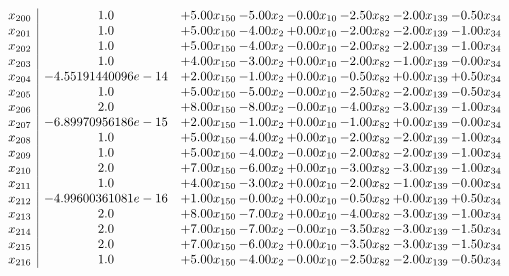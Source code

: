 \documentclass[8pt]{article}
\begin{document}
\[\begin{array}{c| c c@{\hskip 2pt} c@{\hskip 2pt} c@{\hskip 2pt} c@{\hskip 2pt} c@{\hskip 2pt} c@{\hskip 2pt} }
 x_{200}   &  1.0 & +  5.00 x_{150} & -5.00 x_{2} & -0.00 x_{10} & -2.50 x_{82} & -2.00 x_{139} & -0.50 x_{34}\\
 x_{201}   &  1.0 & +  5.00 x_{150} & -4.00 x_{2} & +  0.00 x_{10} & -2.00 x_{82} & -2.00 x_{139} & -1.00 x_{34}\\
 x_{202}   &  1.0 & +  5.00 x_{150} & -4.00 x_{2} & -0.00 x_{10} & -2.00 x_{82} & -2.00 x_{139} & -1.00 x_{34}\\
 x_{203}   &  1.0 & +  4.00 x_{150} & -3.00 x_{2} & +  0.00 x_{10} & -2.00 x_{82} & -1.00 x_{139} & -0.00 x_{34}\\
 x_{204}   &  -4.55191440096e-14 & +  2.00 x_{150} & -1.00 x_{2} & +  0.00 x_{10} & -0.50 x_{82} & +  0.00 x_{139} & +  0.50 x_{34}\\
 x_{205}   &  1.0 & +  5.00 x_{150} & -5.00 x_{2} & -0.00 x_{10} & -2.50 x_{82} & -2.00 x_{139} & -0.50 x_{34}\\
 x_{206}   &  2.0 & +  8.00 x_{150} & -8.00 x_{2} & -0.00 x_{10} & -4.00 x_{82} & -3.00 x_{139} & -1.00 x_{34}\\
 x_{207}   &  -6.89970956186e-15 & +  2.00 x_{150} & -1.00 x_{2} & +  0.00 x_{10} & -1.00 x_{82} & +  0.00 x_{139} & -0.00 x_{34}\\
 x_{208}   &  1.0 & +  5.00 x_{150} & -4.00 x_{2} & +  0.00 x_{10} & -2.00 x_{82} & -2.00 x_{139} & -1.00 x_{34}\\
 x_{209}   &  1.0 & +  5.00 x_{150} & -4.00 x_{2} & -0.00 x_{10} & -2.00 x_{82} & -2.00 x_{139} & -1.00 x_{34}\\
 x_{210}   &  2.0 & +  7.00 x_{150} & -6.00 x_{2} & +  0.00 x_{10} & -3.00 x_{82} & -3.00 x_{139} & -1.00 x_{34}\\
 x_{211}   &  1.0 & +  4.00 x_{150} & -3.00 x_{2} & +  0.00 x_{10} & -2.00 x_{82} & -1.00 x_{139} & -0.00 x_{34}\\
 x_{212}   &  -4.99600361081e-16 & +  1.00 x_{150} & -0.00 x_{2} & +  0.00 x_{10} & -0.50 x_{82} & +  0.00 x_{139} & +  0.50 x_{34}\\
 x_{213}   &  2.0 & +  8.00 x_{150} & -7.00 x_{2} & +  0.00 x_{10} & -4.00 x_{82} & -3.00 x_{139} & -1.00 x_{34}\\
 x_{214}   &  2.0 & +  7.00 x_{150} & -7.00 x_{2} & -0.00 x_{10} & -3.50 x_{82} & -3.00 x_{139} & -1.50 x_{34}\\
 x_{215}   &  2.0 & +  7.00 x_{150} & -6.00 x_{2} & +  0.00 x_{10} & -3.50 x_{82} & -3.00 x_{139} & -1.50 x_{34}\\
 x_{216}   &  1.0 & +  5.00 x_{150} & -4.00 x_{2} & -0.00 x_{10} & -2.50 x_{82} & -2.00 x_{139} & -0.50 x_{34}\\

\end{array}\]
\end{document}
